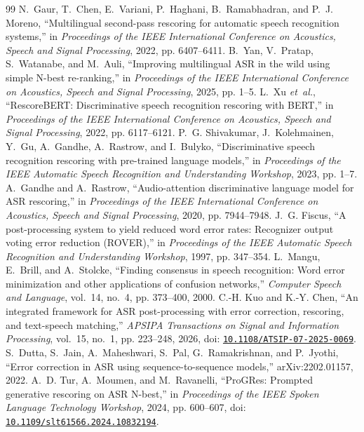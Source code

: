 \begin{thebibliography}{99}
N.~Gaur, T.~Chen, E.~Variani, P.~Haghani, B.~Ramabhadran, and P.~J. Moreno, ``{Multilingual second-pass rescoring for automatic speech recognition systems},'' in \emph{Proceedings of the IEEE International Conference on Acoustics, Speech and Signal Processing}, 2022, pp. 6407--6411.
B.~Yan, V.~Pratap, S.~Watanabe, and M.~Auli, ``{Improving multilingual ASR in the wild using simple N-best re-ranking},'' in \emph{Proceedings of the IEEE International Conference on Acoustics, Speech and Signal Processing}, 2025, pp. 1--5.
L.~Xu \emph{et~al.}, ``{RescoreBERT: Discriminative speech recognition rescoring with BERT},'' in \emph{Proceedings of the IEEE International Conference on Acoustics, Speech and Signal Processing}, 2022, pp. 6117--6121.
P.~G. Shivakumar, J.~Kolehmainen, Y.~Gu, A.~Gandhe, A.~Rastrow, and I.~Bulyko, ``{Discriminative speech recognition rescoring with pre-trained language models},'' in \emph{Proceedings of the IEEE Automatic Speech Recognition and Understanding Workshop}, 2023, pp. 1--7.
A.~Gandhe and A.~Rastrow, ``{Audio-attention discriminative language model for ASR rescoring},'' in \emph{Proceedings of the IEEE International Conference on Acoustics, Speech and Signal Processing}, 2020, pp. 7944--7948.
 J.~G. Fiscus, ``A post-processing system to yield reduced word error rates: Recognizer output voting error reduction (ROVER),'' in \emph{Proceedings of the IEEE Automatic Speech Recognition and Understanding Workshop}, 1997, pp. 347--354.
 L.~Mangu, E.~Brill, and A.~Stolcke, ``Finding consensus in speech recognition: Word error minimization and other applications of confusion networks,'' \emph{Computer Speech and Language}, vol.~14, no.~4, pp. 373--400, 2000.
C.-H. Kuo and K.-Y. Chen, ``{An integrated framework for ASR post-processing with error correction, rescoring, and text-speech matching},'' \emph{APSIPA Transactions on Signal and Information Processing}, vol.~15, no.~1, pp. 223--248, 2026, doi: \href{https://doi.org/10.1108/ATSIP-07-2025-0069}{\nolinkurl{10.1108/ATSIP-07-2025-0069}}.
S.~Dutta, S.~Jain, A.~Maheshwari, S.~Pal, G.~Ramakrishnan, and P.~Jyothi, ``{Error correction in ASR using sequence-to-sequence models},'' arXiv:2202.01157, 2022.
A.~D. Tur, A.~Moumen, and M.~Ravanelli, ``{ProGRes: Prompted generative rescoring on ASR N-best},'' in \emph{Proceedings of the IEEE Spoken Language Technology Workshop}, 2024, pp. 600--607, doi: \href{https://doi.org/10.1109/slt61566.2024.10832194}{\nolinkurl{10.1109/slt61566.2024.10832194}}.

\end{thebibliography}

